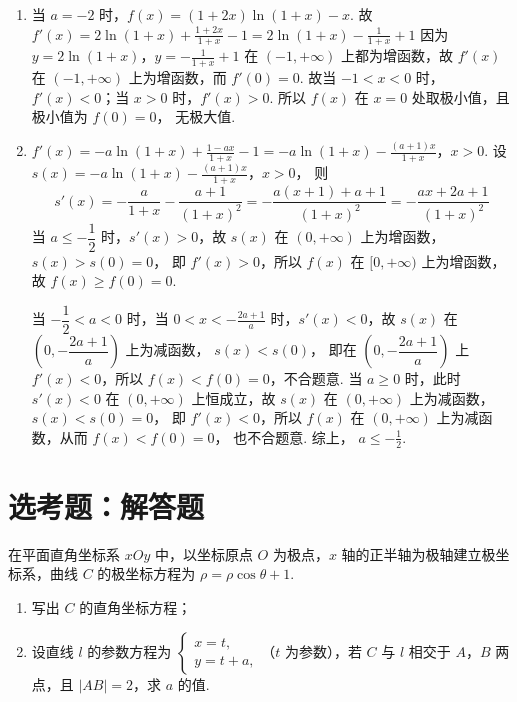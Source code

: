 \begin{solution}
\begin{enumerate}
\item 当 \( a=-2 \) 时，\( f(x)=(1+2x)\ln(1+x)-x \).
故
\(
f'(x)=2\ln(1+x)+\frac{1+2x}{1+x}-1=2\ln(1+x)-\frac{1}{1+x}+1
\)
因为
\(y=2\ln(1+x)\)，\(y=-\frac{1}{1+x}+1\)
在 \( (-1,+\infty) \) 上都为增函数，故 \( f'(x) \) 在 \( (-1,+\infty) \) 上为增函数，而
\(f'(0)=0\).
故当 \( -1<x<0 \) 时，\( f'(x)<0 \)；当 \( x>0 \) 时，\( f'(x)>0 \).
所以 \( f(x) \) 在 \( x=0 \) 处取极小值，且极小值为
\(f(0)=0\)，
无极大值.

\item
\(f'(x)=-a\ln(1+x)+\frac{1-ax}{1+x}-1=-a\ln(1+x)-\frac{(a+1)x}{1+x}\)，\(x>0\).
设
\(s(x)=-a\ln(1+x)-\frac{(a+1)x}{1+x}\)，\(x>0\)，
则
\[
s'(x)=-\frac{a}{1+x}-\frac{a+1}{(1+x)^2}
=-\frac{a(x+1)+a+1}{(1+x)^2}
=-\frac{ax+2a+1}{(1+x)^2}
\]
当 \( a\le -\dfrac{1}{2} \) 时，\( s'(x)>0 \)，故 \( s(x) \) 在 \( (0,+\infty) \) 上为增函数，
\(s(x)>s(0)=0\)，
即 \( f'(x)>0 \)，所以 \( f(x) \) 在 \( [0,+\infty) \) 上为增函数，故
\(f(x)\ge f(0)=0\).

当 \( -\dfrac{1}{2}<a<0 \) 时，当
\(0<x<-\frac{2a+1}{a}\)
时，\( s'(x)<0 \)，故 \( s(x) \) 在 \( \left( 0,-\dfrac{2a+1}{a} \right) \) 上为减函数，
\(s(x)<s(0)\)，
即在 \( \left( 0,-\dfrac{2a+1}{a} \right) \) 上 \( f'(x)<0 \)，所以 \( f(x)<f(0)=0 \)，不合题意.
当 \( a\ge 0 \) 时，此时 \( s'(x)<0 \) 在 \( (0,+\infty) \) 上恒成立，故 \( s(x) \) 在 \( (0,+\infty) \) 上为减函数，
\(s(x)<s(0)=0\)，
即 \( f'(x)<0 \)，所以 \( f(x) \) 在 \( (0,+\infty) \) 上为减函数，从而
\(f(x)<f(0)=0\)，
也不合题意.
综上，
\(a\le -\frac{1}{2}\).
\end{enumerate}
\end{solution}

\section{选考题：解答题}

\begin{problem}
在平面直角坐标系 \( xOy \) 中，以坐标原点 \(O\) 为极点，\( x \) 轴的正半轴为极轴建立极坐标系，曲线 \(C\) 的极坐标方程为 \( \rho=\rho\cos\theta+1 \).

\begin{enumerate}
\item 写出 \(C\) 的直角坐标方程；
\item 设直线 \( l \) 的参数方程为 \(\begin{cases}
x=t,\\
y=t+a,
\end{cases}\)（\( t \) 为参数），若 \(C\) 与 \( l \) 相交于 \(A\)，\(B\) 两点，且 \( |AB|=2 \)，求 \( a \) 的值.
\end{enumerate}
\end{problem}

